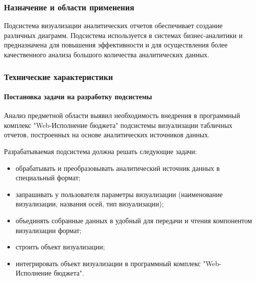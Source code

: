 \documentclass[a4paper]{extarticle}
\numberwithin{equation}{section}
\begin{document}
\subsubsection{Назначение и области применения}
Подсистема визуализации аналитических отчетов обеспечивает создание различных диаграмм. Подсистема используется в системах бизнес-аналитики и предназначена для повышения эффективности и для осуществления более качественного анализа большого количества аналитических данных.

\subsubsection{Технические характеристики}

\paragraph{Постановка задачи на разработку подсистемы}
Анализ предметной области выявил необходимость внедрения в программный комплекс "Web-Исполнение бюджета" подсистемы визуализации табличных отчетов, построенных на основе аналитических источников данных.\par
Разрабатываемая подсистема должна решать следующие задачи:
\begin{itemize}
  \item обрабатывать и преобразовывать аналитический источник данных в специальный формат;
  \item запрашивать у пользователя параметры визуализации (наименование визуализации, названия осей, тип визуализации);
  \item объединять собранные данных в удобный для передачи и чтения компонентом визуализации формат;
  \item строить объект визуализации;
  \item интегрировать объект визуализации в программный комплекс "Web-Исполнение бюджета".
\end{itemize}\par
\end{document}
